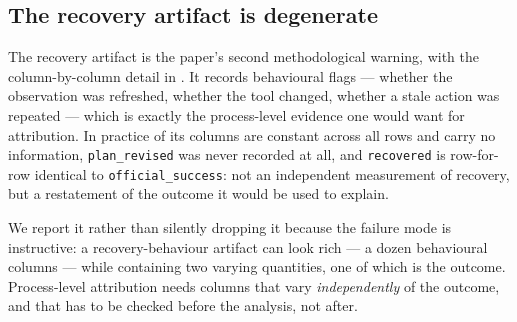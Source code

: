 \subsection{The recovery artifact is degenerate}
\label{sec:res-recovery}

The recovery artifact is the paper's second methodological warning, with the
column-by-column detail in . It records behavioural flags ---
whether the observation was refreshed, whether the tool changed, whether a stale
action was repeated --- which is exactly the process-level evidence one would want
for attribution. In practice \RecDegenerateCount{} of its columns are constant
across all \RecN{} rows and carry no information, \texttt{plan\_revised} was never
recorded at all, and \texttt{recovered} is row-for-row identical to
\texttt{official\_success}: not an independent measurement of recovery, but a
restatement of the outcome it would be used to explain.

We report it rather than silently dropping it because the failure mode is
instructive: a recovery-behaviour artifact can look rich --- a dozen behavioural
columns --- while containing two varying quantities, one of which is the outcome.
Process-level attribution needs columns that vary \emph{independently} of the
outcome, and that has to be checked before the analysis, not after.
